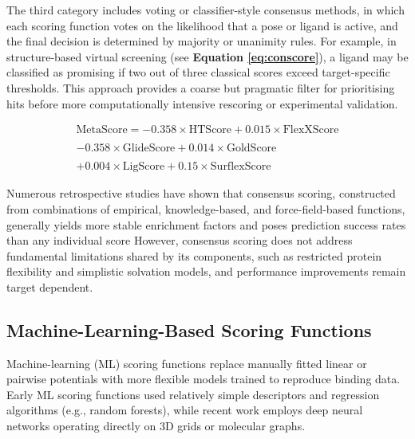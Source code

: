 \documentclass[12pt]{article}
\begin{document}
The third category includes voting or classifier-style consensus methods\cite{CH3_votedock2011}, in which each scoring function votes on the likelihood that a pose or ligand is active, and the final decision is determined by majority or unanimity rules. For example, in structure-based virtual screening (see \textbf{Equation \ref{eq:conscore}}), a ligand may be classified as promising if two out of three classical scores exceed target-specific thresholds. This approach provides a coarse but pragmatic filter for prioritising hits before more computationally intensive rescoring or experimental validation.

\begin{equation}
\begin{aligned}
\text{MetaScore} = -0.358 \times \text{HTScore} + 0.015 \times \text{FlexXScore} \\\\ 
-0.358 \times \text{GlideScore} + 0.014 \times \text{GoldScore} \\\\
+0.004 \times \text{LigScore} + 0.15 \times \text{SurflexScore}
\end{aligned}
\label{eq:conscore}
\end{equation}

Numerous retrospective studies have shown that consensus scoring, constructed from combinations of empirical, knowledge-based, and force-field-based functions, generally yields more stable enrichment factors and poses prediction success rates than any individual score\cite{CH3_konstantinou2007} However, consensus scoring does not address fundamental limitations shared by its components, such as restricted protein flexibility and simplistic solvation models, and performance improvements remain target dependent.


\subsection{Machine-Learning-Based Scoring Functions}

Machine-learning (ML) scoring functions replace manually fitted linear or pairwise potentials with more flexible models trained to reproduce binding data. Early ML scoring functions used relatively simple descriptors and regression algorithms (e.g., random forests), while recent work employs deep neural networks operating directly on 3D grids or molecular graphs\cite{CH3_Ballester2010_RFScore,CH3_Wojcikowski2017_RFScoreVS,CH3_Jimenez2018_KDEEP}.
\end{document}
